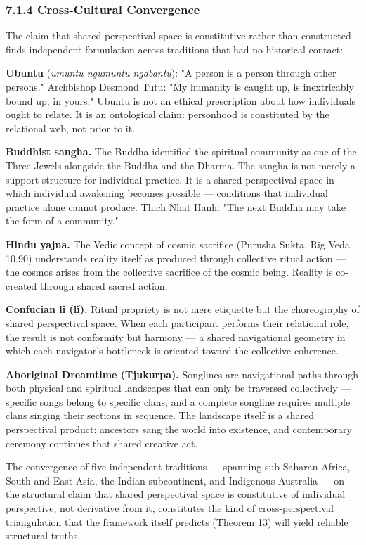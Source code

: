 \subsubsection*{7.1.4 Cross-Cultural Convergence}


The claim that shared perspectival space is constitutive rather than constructed finds independent formulation across traditions that had no historical contact:


\textbf{Ubuntu} (\textit{umuntu ngumuntu ngabantu}): "A person is a person through other persons." Archbishop Desmond Tutu: "My humanity is caught up, is inextricably bound up, in yours." Ubuntu is not an ethical prescription about how individuals ought to relate. It is an ontological claim: personhood is constituted by the relational web, not prior to it.


\textbf{Buddhist sangha.} The Buddha identified the spiritual community as one of the Three Jewels alongside the Buddha and the Dharma. The sangha is not merely a support structure for individual practice. It is a shared perspectival space in which individual awakening becomes possible — conditions that individual practice alone cannot produce. Thich Nhat Hanh: "The next Buddha may take the form of a community."


\textbf{Hindu yajna.} The Vedic concept of cosmic sacrifice (Purusha Sukta, Rig Veda 10.90) understands reality itself as produced through collective ritual action — the cosmos arises from the collective sacrifice of the cosmic being. Reality is co-created through shared sacred action.


\textbf{Confucian l\v{i} ({l\v{i}}).} Ritual propriety is not mere etiquette but the choreography of shared perspectival space. When each participant performs their relational role, the result is not conformity but harmony — a shared navigational geometry in which each navigator's bottleneck is oriented toward the collective coherence.


\textbf{Aboriginal Dreamtime (Tjukurpa).} Songlines are navigational paths through both physical and spiritual landscapes that can only be traversed collectively — specific songs belong to specific clans, and a complete songline requires multiple clans singing their sections in sequence. The landscape itself is a shared perspectival product: ancestors sang the world into existence, and contemporary ceremony continues that shared creative act.


The convergence of five independent traditions — spanning sub-Saharan Africa, South and East Asia, the Indian subcontinent, and Indigenous Australia — on the structural claim that shared perspectival space is constitutive of individual perspective, not derivative from it, constitutes the kind of cross-perspectival triangulation that the framework itself predicts (Theorem 13) will yield reliable structural truths.


